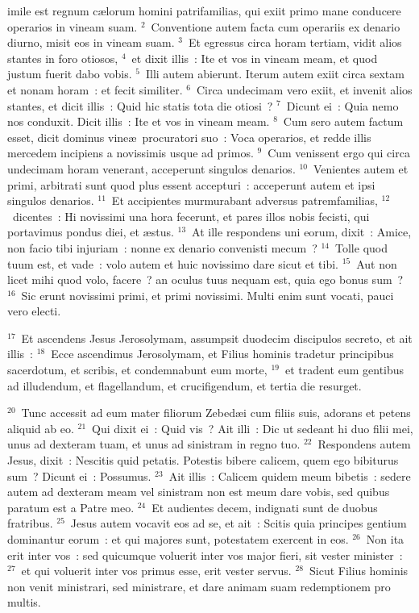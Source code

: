 \bchapter
{}imile est regnum c\ae lorum homini patrifamilias, qui exiit primo mane conducere operarios in vineam suam.
${}^{2}$~Conventione autem facta cum operariis ex denario diurno, misit eos in vineam suam.
${}^{3}$~Et egressus circa horam tertiam, vidit alios stantes in foro otiosos,
${}^{4}$~et dixit illis~: Ite et vos in vineam meam, et quod justum fuerit dabo vobis.
${}^{5}$~Illi autem abierunt. Iterum autem exiit circa sextam et nonam horam~: et fecit similiter.
${}^{6}$~Circa undecimam vero exiit, et invenit alios stantes, et dicit illis~: Quid hic statis tota die otiosi~?
${}^{7}$~Dicunt ei~: Quia nemo nos conduxit. Dicit illis~: Ite et vos in vineam meam.
${}^{8}$~Cum sero autem factum esset, dicit dominus vine\ae\ procuratori suo~: Voca operarios, et redde illis mercedem incipiens a novissimis usque ad primos.
${}^{9}$~Cum venissent ergo qui circa undecimam horam venerant, acceperunt singulos denarios.
${}^{10}$~Venientes autem et primi, arbitrati sunt quod plus essent accepturi~: acceperunt autem et ipsi singulos denarios.
${}^{11}$~Et accipientes murmurabant adversus patremfamilias,
${}^{12}$~dicentes~: Hi novissimi una hora fecerunt, et pares illos nobis fecisti, qui portavimus pondus diei, et \ae stus.
${}^{13}$~At ille respondens uni eorum, dixit~: Amice, non facio tibi injuriam~: nonne ex denario convenisti mecum~?
${}^{14}$~Tolle quod tuum est, et vade~: volo autem et huic novissimo dare sicut et tibi.
${}^{15}$~Aut non licet mihi quod volo, facere~? an oculus tuus nequam est, quia ego bonus sum~?
${}^{16}$~Sic erunt novissimi primi, et primi novissimi. Multi enim sunt vocati, pauci vero electi.


${}^{17}$~Et ascendens Jesus Jerosolymam, assumpsit duodecim discipulos secreto, et ait illis~:
${}^{18}$~Ecce ascendimus Jerosolymam, et Filius hominis tradetur principibus sacerdotum, et scribis, et condemnabunt eum morte,
${}^{19}$~et tradent eum gentibus ad illudendum, et flagellandum, et crucifigendum, et tertia die resurget.


${}^{20}$~Tunc accessit ad eum mater filiorum Zebed\ae i cum filiis suis, adorans et petens aliquid ab eo.
${}^{21}$~Qui dixit ei~: Quid vis~? Ait illi~: Dic ut sedeant hi duo filii mei, unus ad dexteram tuam, et unus ad sinistram in regno tuo.
${}^{22}$~Respondens autem Jesus, dixit~: Nescitis quid petatis. Potestis bibere calicem, quem ego bibiturus sum~? Dicunt ei~: Possumus.
${}^{23}$~Ait illis~: Calicem quidem meum bibetis~: sedere autem ad dexteram meam vel sinistram non est meum dare vobis, sed quibus paratum est a Patre meo.
${}^{24}$~Et audientes decem, indignati sunt de duobus fratribus.
${}^{25}$~Jesus autem vocavit eos ad se, et ait~: Scitis quia principes gentium dominantur eorum~: et qui majores sunt, potestatem exercent in eos.
${}^{26}$~Non ita erit inter vos~: sed quicumque voluerit inter vos major fieri, sit vester minister~:
${}^{27}$~et qui voluerit inter vos primus esse, erit vester servus.
${}^{28}$~Sicut Filius hominis non venit ministrari, sed ministrare, et dare animam suam redemptionem pro multis.


